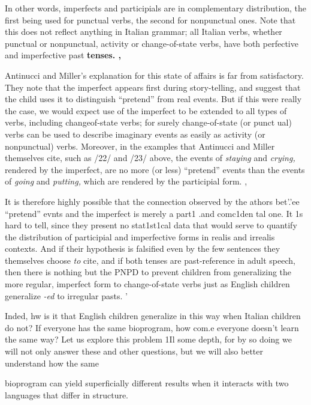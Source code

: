 In other words, imperfects and participials are in complementary distribution, the first being used for punctual verbs, the second for nonpunctual ones. Note that this does not reflect anything in Italian grammar; all Italian verbs, whether punctual or nonpunctual, activity or change-of-state verbs, have both perfective and imperfective past \textbf{tenses. ,}

Antinucci and Miller's explanation for this state of affairs is far from satisfactory. They note that the imperfect appears first during story-telling, and suggest that the child uses it to distinguish ``pretend'' from real events. But if this were really the case, we would expect use of the imperfect to be extended to all types of verbs, including change\-of-state verbs; for surely change-of-state (or punct ual) verbs can be used to describe imaginary events as easily as activity (or nonpunctual) verbs. Moreover, in the examples that Antinucci and Miller them\-selves cite, such as /22/ and /23/ above, the events of \textit{staying }and \textit{crying,} rendered by the imperfect, are no more (or less) ``pretend'' events than the events of \textit{going} and \textit{putting, }which are rendered by the participial form. ,


It is therefore highly possible that the connection observed by the athors bet{\textquotedbl}'.'ee ``pretend'' evnts and the imperfect is merely a part1 .and comc1den tal one. It 1s hard to tell, since they present no stat1st1cal data that would serve to quantify the distribution of participial and imperfective forms in realis and irrealis contexts. And if their hypothesis is falsified even by the few sentences they themselves choose \textit{to} cite, and if both tenses are past-reference in adult speech, then there is nothing but the PNPD to prevent children from general\-izing the more regular, imperfect form to change-of-state verbs just as English children generalize \textit{{}-ed} to irregular pasts. '

Inded, hw is it that English children generalize in this way when Italian children do not? If everyone has the same bioprogram, how com.e everyone doesn't learn the same way? Let us explore this problem 1Il some depth, for by so doing we will not only answer these and other questions, but we will also better understand how the same

bioprogram can yield superficially different results when it interacts with two languages that differ in structure.

